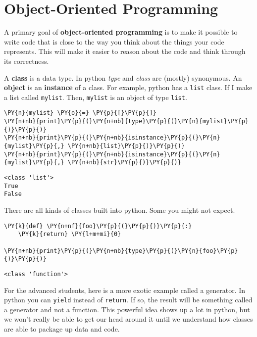 \chapter{Object-Oriented Programming}


A primary goal of \textbf{object-oriented programming} is to make it possible to write code that is close to the way you think about the things your code represents.
This will make it easier to reason about the code and think through its correctness.


A \textbf{class} is a data type.  In python \emph{type} and \emph{class} are (mostly) synonymous.  An \textbf{object} is an \textbf{instance} of a class.  For example, python has a \texttt{list} class.  If I make a list called \texttt{mylist}.  Then, \texttt{mylist} is an object of type \texttt{list}.  


\begin{Verbatim}[commandchars=\\\{\}]
\PY{n}{mylist} \PY{o}{=} \PY{p}{[}\PY{p}{]}
\PY{n+nb}{print}\PY{p}{(}\PY{n+nb}{type}\PY{p}{(}\PY{n}{mylist}\PY{p}{)}\PY{p}{)}
\PY{n+nb}{print}\PY{p}{(}\PY{n+nb}{isinstance}\PY{p}{(}\PY{n}{mylist}\PY{p}{,} \PY{n+nb}{list}\PY{p}{)}\PY{p}{)}
\PY{n+nb}{print}\PY{p}{(}\PY{n+nb}{isinstance}\PY{p}{(}\PY{n}{mylist}\PY{p}{,} \PY{n+nb}{str}\PY{p}{)}\PY{p}{)}
\end{Verbatim}

\begin{Verbatim}
<class 'list'>
True
False

\end{Verbatim}


There are all kinds of classes built into python.  Some you might not expect.


\begin{Verbatim}[commandchars=\\\{\}]
\PY{k}{def} \PY{n+nf}{foo}\PY{p}{(}\PY{p}{)}\PY{p}{:}
    \PY{k}{return} \PY{l+m+mi}{0}

\PY{n+nb}{print}\PY{p}{(}\PY{n+nb}{type}\PY{p}{(}\PY{n}{foo}\PY{p}{)}\PY{p}{)}
\end{Verbatim}

\begin{Verbatim}
<class 'function'>

\end{Verbatim}


For the advanced students, here is a more exotic example called a generator.  In python you can \texttt{yield} instead of \texttt{return}.  If so, the result will be something called a generator and not a function.  This powerful idea shows up a lot in python, but we won't really be able to get our head around it until we understand how classes are able to package up data and code.  


